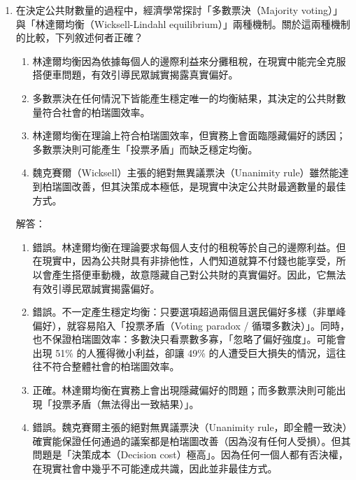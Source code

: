 \documentclass[12pt, a4paper]{article}
\begin{document}
\begin{enumerate}
    \item 在決定公共財數量的過程中，經濟學常探討「多數票決（Majority voting）」與「林達爾均衡（Wicksell-Lindahl equilibrium）」兩種機制。關於這兩種機制的比較，下列敘述何者正確？
    \begin{enumerate}[label=\Alph*.]
        \item 林達爾均衡因為依據每個人的邊際利益來分攤租稅，在現實中能完全克服搭便車問題，有效引導民眾誠實揭露真實偏好。
        \item 多數票決在任何情況下皆能產生穩定唯一的均衡結果，其決定的公共財數量符合社會的柏瑞圖效率。
        \item 林達爾均衡在理論上符合柏瑞圖效率，但實務上會面臨隱藏偏好的誘因；多數票決則可能產生「投票矛盾」而缺乏穩定均衡。
        \item 魏克賽爾（Wicksell）主張的絕對無異議票決（Unanimity rule）雖然能達到柏瑞圖改善，但其決策成本極低，是現實中決定公共財最適數量的最佳方式。
    \end{enumerate}
    解答：
    \begin{enumerate}[label=\Alph*.]
        \item 錯誤。林達爾均衡在理論要求每個人支付的租稅等於自己的邊際利益。但在現實中，因為公共財具有非排他性，人們知道就算不付錢也能享受，所以會產生搭便車動機，故意隱藏自己對公共財的真實偏好。因此，它無法有效引導民眾誠實揭露偏好。
        \item  錯誤。不一定產生穩定均衡：只要選項超過兩個且選民偏好多樣（非單峰偏好），就容易陷入「投票矛盾（Voting paradox / 循環多數決）」。同時，也不保證柏瑞圖效率：多數決只看票數多寡，「忽略了偏好強度」。可能會出現 51\% 的人獲得微小利益，卻讓 49\% 的人遭受巨大損失的情況，這往往不符合整體社會的柏瑞圖效率。
        \item 正確。林達爾均衡在實務上會出現隱藏偏好的問題；而多數票決則可能出現「投票矛盾（無法得出一致結果）」。
        \item 錯誤。魏克賽爾主張的絕對無異議票決（Unanimity rule，即全體一致決）確實能保證任何通過的議案都是柏瑞圖改善（因為沒有任何人受損）。但其問題是「決策成本（Decision cost）極高」。因為任何一個人都有否決權，在現實社會中幾乎不可能達成共識，因此並非最佳方式。
    \end{enumerate}


\end{enumerate}
\end{document}

